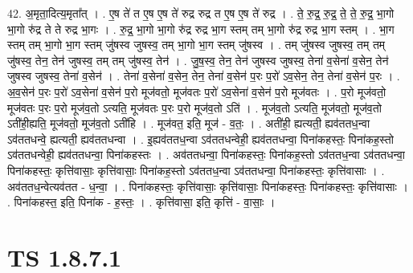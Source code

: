 \documentclass[17pt]{extarticle}
\begin{document}
42. अ॒मृता॒दित्य॒मृता᳚त् । . ए॒ष ते॑ त ए॒ष ए॒ष ते॑ रुद्र रुद्र त ए॒ष ए॒ष ते॑ रुद्र । . ते॒ रु॒द्र॒ रु॒द्र॒ ते॒ ते॒ रु॒द्र॒ भा॒गो भा॒गो रु॑द्र ते ते रुद्र भा॒गः । . रु॒द्र॒ भा॒गो भा॒गो रु॑द्र रुद्र भा॒ग स्तम् तम् भा॒गो रु॑द्र रुद्र भा॒ग स्तम् । . भा॒ग स्तम् तम् भा॒गो भा॒ग स्तम् जु॑षस्व जुषस्व॒ तम् भा॒गो भा॒ग स्तम् जु॑षस्व । . तम् जु॑षस्व जुषस्व॒ तम् तम् जु॑षस्व॒ तेन॒ तेन॑ जुषस्व॒ तम् तम् जु॑षस्व॒ तेन॑ । . जु॒ष॒स्व॒ तेन॒ तेन॑ जुषस्व जुषस्व॒ तेना॑ व॒सेना॑ व॒सेन॒ तेन॑ जुषस्व जुषस्व॒ तेना॑ व॒सेन॑ । . तेना॑ व॒सेना॑ व॒सेन॒ तेन॒ तेना॑ व॒सेन॑ प॒रः प॒रो॑ ऽव॒सेन॒ तेन॒ तेना॑ व॒सेन॑ प॒रः । . अ॒व॒सेन॑ प॒रः प॒रो॑ ऽव॒सेना॑ व॒सेन॑ प॒रो मूज॑वतो॒ मूज॑वतः प॒रो॑ ऽव॒सेना॑ व॒सेन॑ प॒रो मूज॑वतः । . प॒रो मूज॑वतो॒ मूज॑वतः प॒रः प॒रो मूज॑व॒तो ऽत्यति॒ मूज॑वतः प॒रः प॒रो मूज॑व॒तो ऽति॑ । . मूज॑व॒तो ऽत्यति॒ मूज॑वतो॒ मूज॑व॒तो ऽती॑ही॒ह्यति॒ मूज॑वतो॒ मूज॑व॒तो ऽती॑हि । . मूज॑वत॒ इति॒ मूज॑ - व॒तः॒ । . अती॑ही॒ ह्यत्यती॒ ह्यव॑ततध॒न्वा ऽव॑ततधन्वे॒ ह्यत्यती॒ ह्यव॑ततधन्वा । . इ॒ह्यव॑ततध॒न्वा ऽव॑ततधन्वेही॒ ह्यव॑ततधन्वा॒ पिना॑कहस्तः॒ पिना॑कह॒स्तो ऽव॑ततधन्वेही॒ ह्यव॑ततधन्वा॒ पिना॑कहस्तः । . अव॑ततधन्वा॒ पिना॑कहस्तः॒ पिना॑कह॒स्तो ऽव॑ततध॒न्वा ऽव॑ततधन्वा॒ पिना॑कहस्तः॒ कृत्ति॑वासाः॒ कृत्ति॑वासाः॒ पिना॑कह॒स्तो ऽव॑ततध॒न्वा ऽव॑ततधन्वा॒ पिना॑कहस्तः॒ कृत्ति॑वासाः । . अव॑ततध॒न्वेत्यव॑तत - ध॒न्वा॒ । . पिना॑कहस्तः॒ कृत्ति॑वासाः॒ कृत्ति॑वासाः॒ पिना॑कहस्तः॒ पिना॑कहस्तः॒ कृत्ति॑वासाः । . पिना॑कहस्त॒ इति॒ पिना॑क - ह॒स्तः॒ । . कृत्ति॑वासा॒ इति॒ कृत्ति॑ - वा॒साः॒ । \newline
\pagebreak
{}
\section*{ TS 1.8.7.1 }
\end{document}
